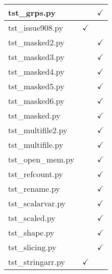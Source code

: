 \begin{table}[H]
\begin{tabular}{|l|c|c|}
tst\_grps.py                            &                              &      $\checkmark$         \\ \hline
tst\_issue908.py                        &          $\checkmark$        &                           \\ \hline
tst\_masked2.py                         &                              &      $\checkmark$         \\ \hline
tst\_masked3.py                         &                              &      $\checkmark$         \\ \hline
tst\_masked4.py                         &                              &      $\checkmark$         \\ \hline
tst\_masked5.py                         &                              &      $\checkmark$         \\ \hline
tst\_masked6.py                         &                              &      $\checkmark$         \\ \hline
tst\_masked.py                          &                              &      $\checkmark$         \\ \hline
tst\_multifile2.py                      &                              &      $\checkmark$         \\ \hline
tst\_multifile.py                       &                              &      $\checkmark$         \\ \hline
tst\_open\_mem.py                       &                              &      $\checkmark$         \\ \hline
tst\_refcount.py                        &                              &      $\checkmark$         \\ \hline
tst\_rename.py                          &                              &      $\checkmark$         \\ \hline
tst\_scalarvar.py                       &                              &      $\checkmark$         \\ \hline
tst\_scaled.py                          &                              &      $\checkmark$         \\ \hline
tst\_shape.py                           &                              &      $\checkmark$         \\ \hline
tst\_slicing.py                         &                              &      $\checkmark$         \\ \hline
tst\_stringarr.py                       &          $\checkmark$        &                           \\ \hline

\end{tabular}
\end{table}
